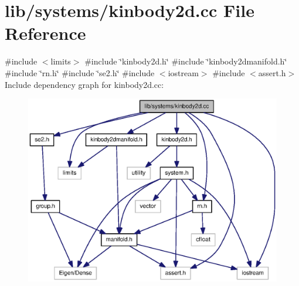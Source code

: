 \section{lib/systems/kinbody2d.cc \-File \-Reference}
\label{kinbody2d_8cc}
{\ttfamily \#include $<$limits$>$}\*
{\ttfamily \#include \char`\"{}kinbody2d.\-h\char`\"{}}\*
{\ttfamily \#include \char`\"{}kinbody2dmanifold.\-h\char`\"{}}\*
{\ttfamily \#include \char`\"{}rn.\-h\char`\"{}}\*
{\ttfamily \#include \char`\"{}se2.\-h\char`\"{}}\*
{\ttfamily \#include $<$iostream$>$}\*
{\ttfamily \#include $<$assert.\-h$>$}\*
\-Include dependency graph for kinbody2d.\-cc\-:\nopagebreak
\begin{figure}[H]
\begin{center}
\leavevmode
\includegraphics[width=350pt]{kinbody2d_8cc__incl}
\end{center}
\end{figure}
